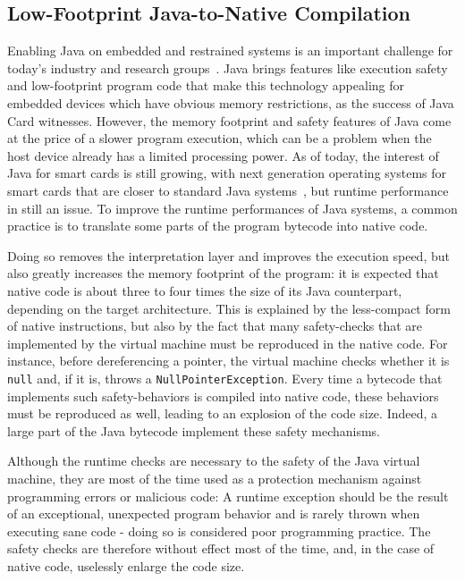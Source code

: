 \subsection{Low-Footprint Java-to-Native Compilation}
Enabling Java on embedded and restrained systems is an important challenge for today's industry and research groups~\cite{Mulchandani1998}. Java brings features like execution safety and low-footprint program code that make this technology appealing for embedded devices which have obvious memory restrictions, as the success of Java Card witnesses. However, the memory footprint and safety features of Java come at the price of a slower program execution, which can be a problem when the host device already has a limited processing power. As of today, the interest of Java for smart cards is still growing, with next generation operating systems for smart cards that are closer to standard Java systems~\cite{Lagosanto2002,Grimaud2003}, but runtime performance in still an issue. To improve the runtime performances of Java systems, a common practice is to translate some parts of the program bytecode into native code.

Doing so removes the interpretation layer and improves the execution speed, but also greatly increases the memory footprint of the program: it is expected that native code is about three to four times the size of its Java counterpart, depending on the target architecture. This is explained by the less-compact form of native instructions, but also by the fact that many safety-checks that are implemented by the virtual machine must be reproduced in the native code. For instance, before dereferencing a pointer, the virtual machine checks whether it is \texttt{null} and, if it is, throws a \texttt{NullPointerException}. Every time a bytecode that implements such safety-behaviors is compiled into native code, these behaviors must be reproduced as well, leading to an explosion of the code size. Indeed, a large part of the Java bytecode implement these safety mechanisms.

Although the runtime checks are necessary to the safety of the Java virtual machine, they are most of the time used as a protection mechanism against programming errors or malicious code: A runtime exception should be the result of an exceptional, unexpected program behavior and is rarely thrown when executing sane code - doing so is considered poor programming practice. The safety checks are therefore without effect most of the time, and, in the case of native code, uselessly enlarge the code size.

